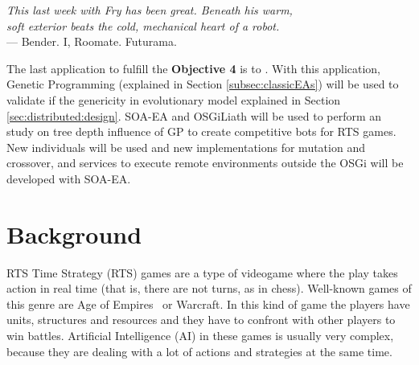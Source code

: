\label{chap:rts}
\begin{flushright}{\slshape
    This last week with Fry has been great. Beneath his warm,  
    \\soft exterior beats the cold, mechanical heart of a robot. } \\ \medskip
    --- {Bender. I, Roomate. Futurama.}
\end{flushright}
\minitoc\mtcskip
\vfill

The last application to fulfill the \textbf{Objective 4} is to . With this application, Genetic Programming (explained in Section \ref{subsec:classicEAs}) will be used to validate if the genericity in evolutionary model explained in Section \ref{sec:distributed:design}. SOA-EA and OSGiLiath will be used to perform an study on tree depth influence of GP to create competitive bots for RTS games. New individuals will be used and new implementations for mutation and crossover, and services to execute remote environments outside the OSGi will be developed with SOA-EA.


\section{Background}

RTS Time Strategy (RTS) games are a type of videogame
where the play takes action in real time (that is, there are not
turns, as in chess). Well-known games of this genre are Age of
Empires\texttrademark~ or Warcraft\texttrademark. In this kind of game
the players have units, structures and resources and they have to
confront with other players to win battles. Artificial Intelligence
(AI) in these games is usually very complex, because they are dealing
with a lot of actions and strategies at the same time. %

